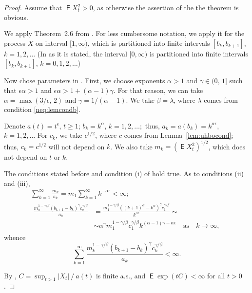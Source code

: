 \documentclass{article}
\DeclareMathOperator{\ME}{\mathsf{E}}
\theoremstyle{plain}
\begin{document}
\begin{proof}
Assume that $\ME X_t^2 > 0$, as otherwise the assertion of the
the theorem is obvious.

We apply Theorem~2.6 from \cite{Dozzi2018}.
For less cumbersome notation, we apply it for the process
$X$ on interval $[1,\infty)$, which is partitioned into
finite intervals $[b_k,b_{k+1}]$,
$k\mathbin{=}1,2,\ldots$
(In \cite[Theorem~2.6]{Dozzi2018} as it is stated, the
interval $[0,\infty)$ is partitioned into finite intervals
$[b_k,b_{k+1}]$,
$k\mathbin{=}0,1,2,\ldots$)

Now chose parameters in \cite[Theorem~2.6]{Dozzi2018}.
First, we choose exponents $\alpha\mathbin{>}1$ and
$\gamma\mathbin{\in}(0,\,1]$ such that
$\epsilon \alpha > 1$ and $\epsilon \alpha > 1 + (\alpha-1) \gamma$.
For that reason, we can take $\alpha = \max(3/\epsilon,\, 2)$
and $\gamma = 1/(\alpha-1)$.  We take $\beta=\lambda$,
where $\lambda$ comes from condition \eqref{neq:lemcondb}.

Denote $a(t) = t^\epsilon$,
$t\mathbin{\ge}1$;
$b_k=k^\alpha$,
$k\mathbin{=}1,2,\ldots;$
thus,
$a_k = a(b_k)=k^{\alpha \epsilon}$,
$k\mathbin{=}1,2,\ldots$
For $c_k$, we take $c^{1/2}$, where $c$ comes from
Lemma~\ref{lem:uhbocond};
thus, $c_k = c^{1/2}$ will not depend on $k$.
We also take $m_k = \left( \ME X_t^2 \right)^{1/2}$,
which does not depend on $t$ or $k$.

The conditions stated before \cite[Theorem~2.6]{Dozzi2018}
and condition (i) of \cite[Theorem~2.6]{Dozzi2018}
hold true.
As to conditions (ii) and (iii),
\begin{gather*}
\sum_{k=1}^\infty \frac{m_k}{a_k} = m_1 \sum_{k=1}^\infty k^{-\alpha \epsilon} < \infty; \\
\begin{aligned}
\frac{m_k^{1-\gamma/\beta} (b_{k+1} - b_k)^\gamma c_k^{\gamma/\beta}}
{a_k}
&=
\frac{m_1^{1-\gamma/\beta} ((k+1)^\alpha - k^\alpha)^\gamma  c_1^{\gamma/\beta}}
{k^{\alpha \epsilon}}
\sim \\ &\sim
 \alpha^\gamma m_1^{1-\gamma/\beta}  c_1^{\gamma/\beta} k^{(\alpha-1)\gamma - \alpha\epsilon}
\quad \mbox{as} \quad k\mathbin{\to}\infty,
\end{aligned}
\end{gather*}
whence
\[
\sum_{k=1}^\infty
\frac{m_k^{1-\gamma/\beta} (b_{k+1} - b_k)^\gamma c_k^{\gamma/\beta}}
{a_k} < \infty .
\]

By \cite[Theorem~2.6]{Dozzi2018},
$C = \sup_{t>1} |X_t|\mathbin{/}a(t)$
is finite a.s.,
and
$\ME \exp(t C) < \infty$ for all $t>0$.
\end{proof}
\end{document}
